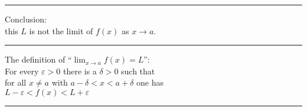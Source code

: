 \documentclass{amsart}
\begin{document}
\setlength{\parindent}{0pt}
\pagestyle{empty}
\hrule
\begin{minipage}[b]{185pt}
  
\end{minipage}
\begin{minipage}[b]{160pt}
  \sffamily%
  \color{blue}Conclusion:\\ this $L$ is not the limit of $f(x)$ as $x\to a$. 
  
  \rule{0pt}{18pt}
 \end{minipage}
\hrule
\begin{center}
    \sffamily\color[rgb]{0.75,0.0,0.0}The definition of ``$\lim_{x\to a} f(x) = L$'':\\
    \sffamily\color[rgb]{0.0,0.25,0.5} 
    For every $\varepsilon>0$ there is a $\delta>0$ such that \\
    for all $x\neq a$ with $a-\delta < x < a+\delta$ one has\\
    $L-\varepsilon < f(x) < L+\varepsilon$
\end{center}
\hrule
\end{document}

